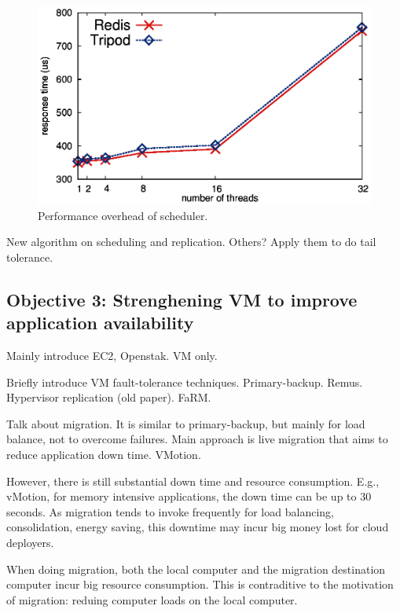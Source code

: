\begin{figure}[!htb]
\centering
\includegraphics[width=0.34\textheight]{figures/scheduler_latency.ps}
        \vspace{0.1in}
        \caption{Performance overhead of scheduler.}
        \label{fig:scheduler-latency}
\end{figure}

 New algorithm on scheduling and replication. Others? 
Apply them to do tail tolerance.

\vspace{-.15in}\subsection{Objective 3: Strenghening VM to improve application 
availability}\label{sec:defense}\vspace{-.075in}

Mainly introduce EC2, Openstak. VM only.

Briefly introduce VM fault-tolerance techniques. Primary-backup. Remus. 
Hypervisor replication (old paper). FaRM.

Talk about migration. It is similar to primary-backup, but mainly for load 
balance, not to overcome failures. Main approach is live migration that aims to 
reduce application down time. VMotion.

However, there is still substantial down time and resource consumption. E.g., 
vMotion, for memory intensive applications, the down time can be up to 30 
seconds. As migration tends to invoke frequently for load balancing, 
consolidation, energy saving, this downtime may incur big money lost for cloud 
deployers.

When doing migration, both the local computer and the migration destination 
computer incur big resource consumption. This is contraditive to the motivation 
of migration: reduing computer loads on the local computer.

